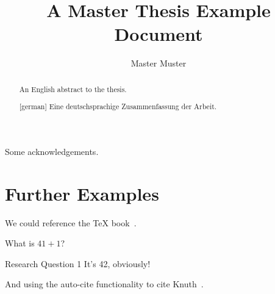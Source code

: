 \documentclass[%
  class=scrreprt,%
  chapterprefix=false,%
  open=right,%
  logofile={lion.png},%
  paper=a4,%
  thesistype=master,%
  toc=chapterentrydotfill,%
  twoside=true,%
  UKenglish,%
]{se2thesis}
\author{Master Muster}
\title{A Master Thesis Example Document}
\institute{Chair of Example}
\begin{document}
\frontmatter

\maketitle

\authorshipDeclaration

\begin{abstract}
  An English abstract to the thesis.
\end{abstract}

\begin{abstract}[german]
  Eine deutschsprachige Zusammenfassung der Arbeit.
\end{abstract}

\begin{acknowledgements}
  Some acknowledgements.
\end{acknowledgements}

\tableofcontents

\mainmatter

\blinddocument

\section{Further Examples}

We could reference the \TeX{} book~\autocite{Knu86}.

\begin{resq}
    What is \(41 + 1\)?
\end{resq}

\begin{summary}{Research Question 1}
   It's 42, obviously!
\end{summary}

And using the auto-cite functionality to cite Knuth~\autocite{Knu86}.

\backmatter

\printbibliography
\end{document}
